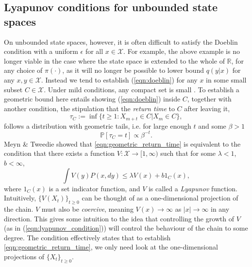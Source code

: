 \documentclass{article}
\newcommand{\ch}[1]{ \{#1_t\}_{t \geq 0} }
\newcommand{\X}{\mathcal{X}}
\begin{document}
\subsection{Lyapunov conditions for unbounded state spaces}
On unbounded state spaces, however, it is often difficult to satisfy the Doeblin condition with a uniform $\epsilon$ for all $x \in \X$. For example, the above example is no longer viable in the case where the state space is extended to the whole of $\mathbb{R}$, for any choice of $\pi(\cdot)$, as it will no longer be possible to lower bound $q(y|x)$ for any $x,y \in \X$.  Instead we tend to establish (\ref{eqn:doeblin}) for any $x$ in some small subset $C \in \X$.  Under mild conditions, any compact set is small \cite{roberts1996geometric}.  To establish a geometric bound here entails showing (\ref{eqn:doeblin}) inside $C$, together with another condition, the stipulation that the \emph{return time} to $C$ after leaving it,
\begin{equation} \label{eqn:return}
\tau_C := \inf \{ t \geq 1 : X_{m+t} \in C | X_m \in C \},
\end{equation}
follows a distribution with geometric tails, i.e. for large enough $t$ and some $\beta > 1$
\begin{equation}
\mathbb{P}[\tau_C = t] \propto \beta^{-t}. \label{eqn:geometric_return_time}
\end{equation}
Meyn \& Tweedie showed that \eqref{eqn:geometric_return_time} is equivalent to the condition that there exists a function $V: \X \to [1,\infty)$ such that for some $\lambda<1$, $b < \infty$,
\begin{equation}
\int V(y)P(x,dy) \leq \lambda V(x) + b1_C(x), \label{eqn:lyapunov_condition}
\end{equation}
where $1_C(x)$ is a  set indicator function, and $V$  is called a \emph{Lyapunov} function.  Intuitively, $\{ V(X_t) \}_{t \geq 0}$ can be thought of as a one-dimensional projection of the chain.  $V$ must also be \emph{coercive}, meaning $V(x) \to \infty$ as $|x| \to \infty$ in any direction.  This gives some intuition to the idea that controlling the growth of $V$ (as in (\ref{eqn:lyapunov_condition})) will control the behaviour of the chain to some degree.  The condition effectively states that to establish \eqref{eqn:geometric_return_time}, we only need look at the one-dimensional projections of $\ch{X}$.
\end{document}
